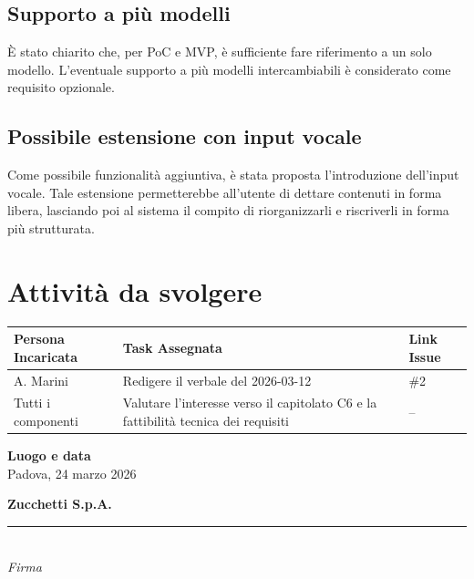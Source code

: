 \documentclass[a4paper, 10pt, colorlinks=true, linkcolor=black, urlcolor=blue, citecolor=blue, hidelinks]{article}
\begin{document}
\subsection{Supporto a più modelli}
È stato chiarito che, per PoC e MVP, è sufficiente fare riferimento a un solo modello. L'eventuale supporto a più modelli intercambiabili è considerato come requisito opzionale.

\subsection{Possibile estensione con input vocale}
Come possibile funzionalità aggiuntiva, è stata proposta l'introduzione dell'input vocale. Tale estensione permetterebbe all'utente di dettare contenuti in forma libera, lasciando poi al sistema il compito di riorganizzarli e riscriverli in forma più strutturata.

\section{Attività da svolgere}
\begin{center}
\renewcommand{\arraystretch}{1.4}
\begin{tabular}{|p{4.2cm}|p{6.2cm}|p{2.2cm}|}
\hline
\textbf{Persona Incaricata} & \textbf{Task Assegnata} & \centering\textbf{Link Issue} \tabularnewline
\hline
A. Marini & Redigere il verbale del 2026-03-12 & \centering \#2 \tabularnewline
\hline
Tutti i componenti & Valutare l'interesse verso il capitolato C6 e la fattibilità tecnica dei requisiti & \centering -- \tabularnewline
\hline
\end{tabular}
\end{center}

\vfill %
\enlargethispage{3.5cm} %

\noindent
\begin{minipage}[t]{0.45\textwidth}
  \textbf{Luogo e data} \\
  \vspace{0.5cm}
  Padova, 24 marzo 2026
\end{minipage}
\hfill
\begin{minipage}[t]{0.45\textwidth}
  \raggedleft
  \textbf{Zucchetti S.p.A.} \\
  \vspace{1.2cm}
  \rule{6cm}{0.4pt} \\
  \textit{Firma}
\end{minipage}
\end{document}
